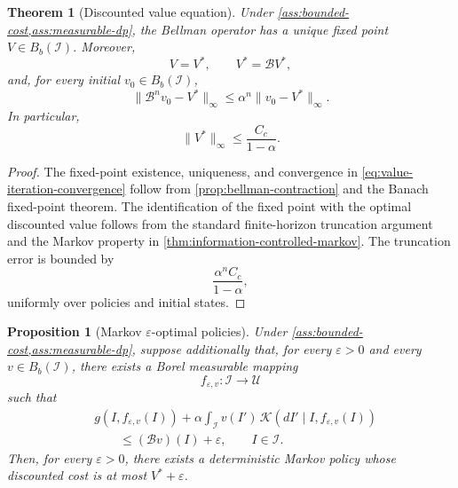 \documentclass[10pt,twocolumn]{article}
\newtheorem{theorem}{Theorem}
\newtheorem{proposition}{Proposition}
\theoremstyle{remark}
\newcommand{\Ucal}{\mathcal{U}}
\newcommand{\Ical}{\mathcal{I}}
\begin{document}
\begin{theorem}[Discounted value equation]
	\label{thm:discounted-value-equation}
	Under \cref{ass:bounded-cost,ass:measurable-dp}, the Bellman operator has a unique fixed point \(V\in B_b(\Ical)\). Moreover,
	\begin{equation*}
		V=V^*,
		\qquad
		V^*=\mathcal BV^*,
		\label{eq:discounted-bellman-equation}
	\end{equation*}
	and, for every initial \(v_0\in B_b(\Ical)\),
	\begin{equation}
		\|\mathcal B^nv_0-V^*\|_\infty
		\leq
		\alpha^n\|v_0-V^*\|_\infty.
		\label{eq:value-iteration-convergence}
	\end{equation}
	In particular,
	\begin{equation*}
		\|V^*\|_\infty
		\leq\frac{C_c}{1-\alpha}.
		\label{eq:optimal-value-bound}
	\end{equation*}
\end{theorem}

\begin{proof}
	The fixed-point existence, uniqueness, and convergence in \cref{eq:value-iteration-convergence} follow from \cref{prop:bellman-contraction} and the Banach fixed-point theorem. The identification of the fixed point with the optimal discounted value follows from the standard finite-horizon truncation argument and the Markov property in \cref{thm:information-controlled-markov}. The truncation error is bounded by
	\[
	\frac{\alpha^nC_c}{1-\alpha},
	\]
	uniformly over policies and initial states.
\end{proof}

\begin{proposition}[Markov \texorpdfstring{\(\varepsilon\)}{epsilon}-optimal policies]
	\label{prop:epsilon-optimal-markov-policies}
	Under \cref{ass:bounded-cost,ass:measurable-dp}, suppose additionally that, for every \(\varepsilon>0\) and every \(v\in B_b(\Ical)\), there exists a Borel measurable mapping
	\[
	f_{\varepsilon,v}:\Ical\longrightarrow\Ucal
	\]
	such that
	\begin{equation*}
		\begin{aligned}
			&g(I,f_{\varepsilon,v}(I))
			+
			\alpha\int_{\Ical}v(I')\,
			\mathcal K(dI'\mid I,f_{\varepsilon,v}(I))
			\\
			&\qquad\leq
			(\mathcal Bv)(I)+\varepsilon,
			\qquad I\in\Ical.
		\end{aligned}
		\label{eq:epsilon-selector}
	\end{equation*}
	Then, for every \(\varepsilon>0\), there exists a deterministic Markov policy whose discounted cost is at most \(V^*+\varepsilon\).
\end{proposition}
\end{document}
